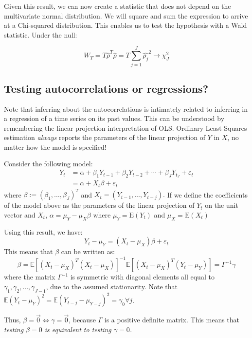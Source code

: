 \documentclass[11pt, a4paper]{report}
\theoremstyle{plain}
\theoremstyle{plain}
\theoremstyle{remark}
\begin{document}
Given this result, we can now create a statistic that does not depend on the multivariate normal distribution. We will square and sum the expression to arrive at a Chi-squared distribution. This enables us to test the hypothesis with a Wald statistic. Under the null:

$$
W_{T}=T \hat{\rho}^{T} \hat{\rho}=T \sum_{j=1}^{J} \hat{\rho_{j}}^{2} \rightarrow \chi_{J}^{2}
$$

\subsection{Testing autocorrelations or regressions?}

Note that inferring about the autocorrelations is intimately related to inferring in a regression of a time series on its past values. This can be understood by remembering the linear projection interpretation of OLS. Ordinary Least Squares estimation \textit{always} reports the parameters of the linear projection of $Y$ in $X$, no matter how the model is specified!

Consider the following model:
$$
\begin{aligned}
	Y_{t} &=\alpha+\beta_{1} Y_{t-1}+\beta_{2} Y_{t-2}+\cdots+\beta_{J} Y_{t_{J}}+\varepsilon_{t} \\
	&=\alpha+X_{t} \beta+\varepsilon_{t}
\end{aligned}
$$
where $\beta:=\left(\beta_{1}, \ldots, \beta_{J}\right)^{T}$ and $X_{t}=\left(Y_{t-1}, \ldots, Y_{t-j}\right) .$ If we define the coefficients of the model above as the parameters of the linear projection of $Y_t$ on the unit vector and $X_t$, $\alpha=\mu_{Y}-\mu_{X} \beta$ where $\mu_{Y}=\mathrm{E}\left(Y_{t}\right)$ and $\mu_{X}=\mathrm{E}\left(X_{t}\right)$

Using this result, we have:
$$
Y_{t}-\mu_{Y}=\left(X_{t}-\mu_{X}\right) \beta+\varepsilon_{t}
$$
This means that $\beta$ can be written as:
$$
\beta=\mathbb{E}\left[\left(X_{t}-\mu_{X}\right)^{T}\left(X_{t}-\mu_{X}\right)\right]^{-1} \mathbb{E}\left[\left(X_{t}-\mu_{X}\right)^{T}\left(Y_{t}-\mu_{Y}\right)\right]=\Gamma^{-1} \gamma
$$
where the matrix $\Gamma^{-1}$ is symmetric with diagonal elements all equal to $\gamma_{1}, \gamma_{2}, \ldots, \gamma_{J-1}$, due to the assumed stationarity. Note that $\mathbb{E}(Y_t - \mu_Y)^2 = \mathbb{E}(Y_{t-j} - \mu_{Y-j})^2 = \gamma_0 \forall j$.

Thus, $\beta=\overrightarrow{0} \Longleftrightarrow \gamma=\overrightarrow{0}$, because $\Gamma$ is a positive definite matrix. This means that \textit{testing $\beta = 0$ is equivalent to testing $\gamma = 0$.}
\end{document}
